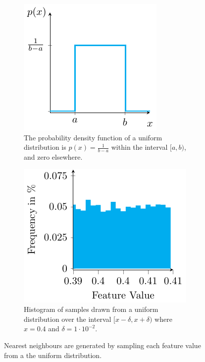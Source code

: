  \begin{figure}
    \centering
    \begin{subfigure}[b]{0.45\textwidth}
        \centering
        \includegraphics[width=\textwidth]{tikz/uniform_distribution.pdf}
        \caption{The probability density function of a uniform distribution is $p(x) = \frac{1}{b-a}$ within the interval $[a, b)$, and zero elsewhere.}
        \label{subfig:uniform_dist}
    \end{subfigure}
    \hfill
    \begin{subfigure}[b]{0.45\textwidth}
        \centering
        \includegraphics[width=\textwidth]{tikz/histogram_nearest_neighbour.pdf}
        \caption{Histogram of  samples drawn from a uniform distribution over the interval $[x-\delta, x+\delta)$ where $x=0.4$ and $\delta=1 \cdot 10^{-2}$.}
        \label{subfig:hist_nn}
    \end{subfigure}
    \caption{Nearest neighbours are generated by sampling each feature value from a the uniform distribution.}
    \label{fig:uniform_dist_nn}
\end{figure}

